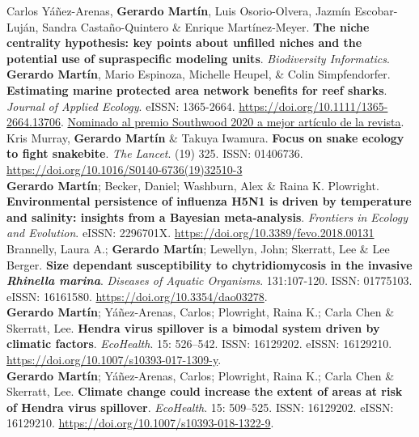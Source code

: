 \documentclass[11pt, letter]{article}
\newcommand{\years}[1]{\marginnote{\scriptsize #1}}
\begin{document}
\years{2020} Carlos Y\'a\~nez-Arenas, \textbf{Gerardo Mart\'in}, Luis Osorio-Olvera, Jazm\'in Escobar-Luj\'an, Sandra Casta\~no-Quintero \& Enrique Mart\'inez-Meyer. \textbf{The niche centrality hypothesis: key points about unfilled niches and the potential use of supraspecific modeling units}. \emph{Biodiversity Informatics}.\\

\years{2020} \textbf{Gerardo Mart\'in}, Mario Espinoza, Michelle Heupel, \& Colin Simpfendorfer. \textbf{Estimating marine protected area network benefits for reef sharks}. \emph{Journal of Applied Ecology}. eISSN: 1365-2664. \url{https://doi.org/10.1111/1365-2664.13706}. \href{https://besjournals.onlinelibrary.wiley.com/doi/toc/10.1111/(ISSN)1365-2664.Southwood_Prize_2020}{Nominado al premio Southwood 2020 a mejor artículo de la revista}.\\

\years{2019} Kris Murray, \textbf{Gerardo Mart\'in} \& Takuya Iwamura. \textbf{Focus on snake ecology to fight snakebite}. \emph{The Lancet}. (19) 325. ISSN: 01406736. \url{https://doi.org/10.1016/S0140-6736(19)32510-3}\\

\years{2018} \textbf{Gerardo Mart\'in}; Becker, Daniel; Washburn, Alex \& Raina K. Plowright. \textbf{Environmental persistence of influenza H5N1 is driven by temperature and salinity: insights from a Bayesian meta-analysis}. \emph{Frontiers in Ecology and Evolution}. eISSN: 2296701X. \url{https://doi.org/10.3389/fevo.2018.00131}\\

\years{2018} Brannelly, Laura A.; \textbf{Gerardo Mart\'in}; Lewellyn, John; Skerratt, Lee \& Lee Berger. \textbf{Size dependant susceptibility to chytridiomycosis in the invasive \emph{Rhinella marina}}. \emph{Diseases of Aquatic Organisms}. 131:107-120. ISSN: 01775103. eISSN: 16161580. \url{ https://doi.org/10.3354/dao03278}.\\

\years{2018} \textbf{Gerardo Mart\'in}; Y\'a\~nez-Arenas, Carlos; Plowright, Raina K.; Carla Chen \& Skerratt, Lee. \textbf{Hendra virus spillover is a bimodal system driven by climatic factors}. \emph{EcoHealth}. 15: 526–542. ISSN: 16129202. eISSN: 16129210. \url{https://doi.org/10.1007/s10393-017-1309-y}.\\

\years{2018} \textbf{Gerardo Mart\'in}; Y\'a\~nez-Arenas, Carlos; Plowright, Raina K.; Carla Chen \& Skerratt, Lee. \textbf{Climate change could increase the extent of areas at risk of Hendra virus spillover}. \emph{EcoHealth}. 15: 509–525. ISSN: 16129202. eISSN: 16129210. \url{https://doi.org/10.1007/s10393-018-1322-9}.\\
\end{document}
